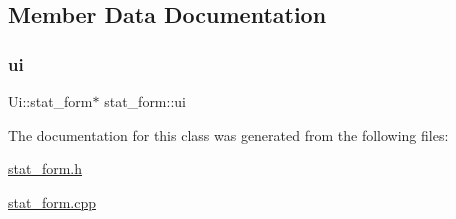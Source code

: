 \subsection{Member Data Documentation}
\mbox{\label{classstat__form_ad5b81bf00866310ef140276effa0f165}} 
\subsubsection{\texorpdfstring{ui}{ui}}
{\footnotesize\ttfamily Ui\+::stat\+\_\+form$\ast$ stat\+\_\+form\+::ui\hspace{0.3cm}{\ttfamily [private]}}



The documentation for this class was generated from the following files\+:\begin{DoxyCompactItemize}
\item 
\mbox{\hyperlink{stat__form_8h}{stat\+\_\+form.\+h}}\item 
\mbox{\hyperlink{stat__form_8cpp}{stat\+\_\+form.\+cpp}}\end{DoxyCompactItemize}
